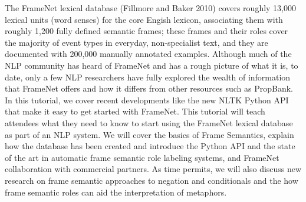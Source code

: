 The FrameNet lexical database (Fillmore and Baker 2010) covers roughly 13,000 lexical units (word senses) for the core Engish lexicon, associating them with roughly 1,200 fully defined semantic frames; these frames and their roles cover the majority of event types in everyday, non-specialist text, and they are documented with 200,000 manually annotated examples. Although much of the NLP community has heard of FrameNet and has a rough picture of what it is, to date, only a few NLP researchers have fully explored the wealth of information that FrameNet offers and how it differs from other resources such as PropBank. In this tutorial, we cover recent developments like the new NLTK Python API that make it easy to get started with FrameNet. This tutorial will teach attendees what they need to know to start using the FrameNet lexical database as part of an NLP system. We will cover the basics of Frame Semantics, explain how the database has been created and introduce the Python API and the state of the art in automatic frame semantic role labeling systems, and FrameNet collaboration with commercial partners. As time permits, we will also discuss new research on frame semantic approaches to negation and conditionals and the how frame semantic roles can aid the interpretation of metaphors.
